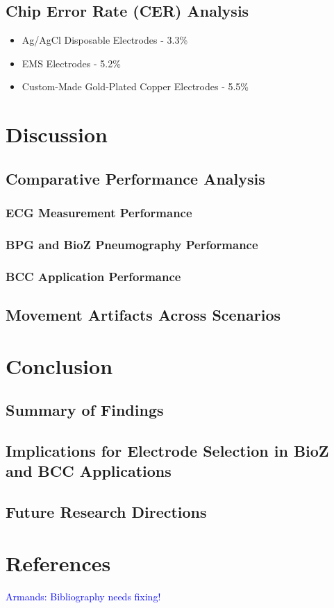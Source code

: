 \documentclass[conference]{IEEEtran}
\newcommand{\notea}[1]{\textcolor{blue}{Armands: #1}}
\begin{document}
\subsection{Chip Error Rate (CER) Analysis}
\begin{itemize}
    \item Ag/AgCl Disposable Electrodes - 3.3\%
    \item EMS Electrodes - 5.2\%
    \item Custom-Made Gold-Plated Copper Electrodes - 5.5\%
\end{itemize}

\section{Discussion}
\subsection{Comparative Performance Analysis}
\subsubsection{ECG Measurement Performance}
\subsubsection{BPG and BioZ Pneumography Performance}
\subsubsection{BCC Application Performance}
\subsection{Movement Artifacts Across Scenarios}

\section{Conclusion}
\subsection{Summary of Findings}
\subsection{Implications for Electrode Selection in BioZ and BCC Applications}
\subsection{Future Research Directions}

\section*{References}
\notea{Bibliography needs fixing!}



\end{document}
